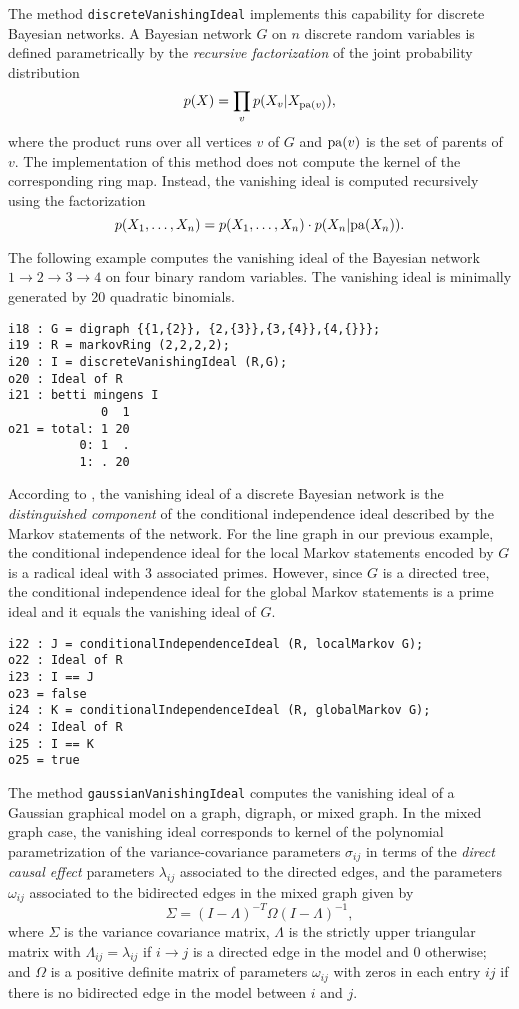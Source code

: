 \documentclass[letterpaper]{article}
\theoremstyle{definition}
\newcommand{\pa}{{\rm pa}}
\begin{document}
The method
{\tt discreteVanishingIdeal} implements this capability for discrete Bayesian
networks. A Bayesian network $G$ on $n$ discrete random variables 
is defined parametrically by the
\emph{recursive factorization} of the joint probability  distribution
\[p(X) = \prod_{v} p(X_{v} | X_{\pa(v)}),\]
where the product runs over all vertices $v$ of $G$ and $\pa(v)$ is the set of
parents of $v$. 
The implementation of this method does not compute the kernel of the
corresponding ring map. Instead, the vanishing ideal is
computed recursively using the factorization 
\[p(X_{1},\dots, X_{n}) = p(X_{1},\dots, X_{n})\cdot p(X_{n} | \pa(X_{n})).\]

The following example computes the vanishing ideal of the Bayesian network $1\to
2 \to 3\to 4$ on four binary random variables. The vanishing ideal is
minimally generated by 20 quadratic binomials.

\begin{verbatim}
i18 : G = digraph {{1,{2}}, {2,{3}},{3,{4}},{4,{}}};
i19 : R = markovRing (2,2,2,2);
i20 : I = discreteVanishingIdeal (R,G);
o20 : Ideal of R
i21 : betti mingens I
             0  1
o21 = total: 1 20
          0: 1  .
          1: . 20
\end{verbatim}

According to \cite{GSS}, the vanishing ideal of a discrete Bayesian network is the \emph{distinguished
  component} of the conditional independence ideal described by the Markov
statements of the network. For the line graph in our previous example, the
conditional independence ideal for the local Markov statements encoded by $G$
is a radical ideal with 3 associated primes. However, since $G$ is a directed
tree, the conditional independence ideal for the global Markov statements is a
prime ideal and it equals the vanishing ideal of $G$.

 \begin{verbatim}
i22 : J = conditionalIndependenceIdeal (R, localMarkov G);
o22 : Ideal of R
i23 : I == J
o23 = false
i24 : K = conditionalIndependenceIdeal (R, globalMarkov G);
o24 : Ideal of R
i25 : I == K
o25 = true
\end{verbatim}

The method {\tt gaussianVanishingIdeal} computes the vanishing ideal of a
Gaussian graphical model on a graph, digraph, or mixed graph. In the mixed graph
case, the vanishing ideal corresponds to kernel of the polynomial parametrization of the
variance-covariance parameters  $\sigma_{ij}$ in terms of the \emph{direct
  causal effect} parameters $\lambda_{ij}$ associated to the directed edges,   
and the parameters $\omega_{ij}$ associated to the
bidirected edges in the mixed graph given by
\[\Sigma = (I - \Lambda)^{-T}\Omega(I-\Lambda)^{-1},\] 
where $\Sigma$ is the variance covariance matrix, $\Lambda$ is the strictly
upper triangular matrix with $\Lambda_{ij} = \lambda_{ij}$ if $i\to j$ is a
directed edge in the model and 0 otherwise; and $\Omega$ is a positive definite
matrix of parameters $\omega_{ij}$ with zeros in each entry $ij$ if there is no
bidirected edge in the model between $i$ and $j$.
\end{document}

